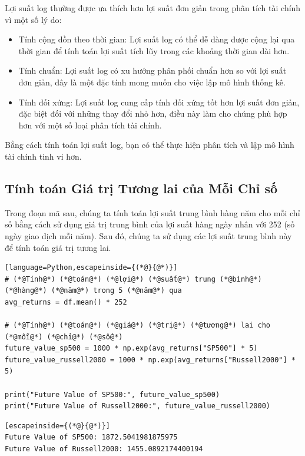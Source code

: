 Lợi suất log thường được ưa thích hơn lợi suất đơn giản trong phân tích tài chính vì một số lý do:

\begin{itemize}
  \item Tính cộng dồn theo thời gian: Lợi suất log có thể dễ dàng được cộng lại qua thời gian để tính toán lợi suất tích lũy trong các khoảng thời gian dài hơn.
  \item Tính chuẩn: Lợi suất log có xu hướng phân phối chuẩn hơn so với lợi suất đơn giản, đây là một đặc tính mong muốn cho việc lập mô hình thống kê.
  \item Tính đối xứng: Lợi suất log cung cấp tính đối xứng tốt hơn lợi suất đơn giản, đặc biệt đối với những thay đổi nhỏ hơn, điều này làm cho chúng phù hợp hơn với một số loại phân tích tài chính.
\end{itemize}
Bằng cách tính toán lợi suất log, bạn có thể thực hiện phân tích và lập mô hình tài chính tinh vi hơn.

\subsection{Tính toán Giá trị Tương lai của Mỗi Chỉ số}

Trong đoạn mã sau, chúng ta tính toán lợi suất trung bình hàng năm cho mỗi chỉ số bằng cách sử dụng giá trị trung bình của lợi suất hàng ngày nhân với 252 (số ngày giao dịch mỗi năm). Sau đó, chúng ta sử dụng các lợi suất trung bình này để tính toán giá trị tương lai.

\begin{lstlisting}[language=Python,escapeinside={(*@}{@*)}]
# (*@Tính@*) (*@toán@*) (*@lợi@*) (*@suất@*) trung (*@bình@*) (*@hàng@*) (*@năm@*) trong 5 (*@năm@*) qua
avg_returns = df.mean() * 252

# (*@Tính@*) (*@toán@*) (*@giá@*) (*@trị@*) (*@tương@*) lai cho (*@mỗi@*) (*@chỉ@*) (*@số@*)
future_value_sp500 = 1000 * np.exp(avg_returns["SP500"] * 5)
future_value_russell2000 = 1000 * np.exp(avg_returns["Russell2000"] * 5)

print("Future Value of SP500:", future_value_sp500)
print("Future Value of Russell2000:", future_value_russell2000)
\end{lstlisting}

\begin{lstlisting}[escapeinside={(*@}{@*)}]
Future Value of SP500: 1872.5041981875975
Future Value of Russell2000: 1455.0892174400194
\end{lstlisting}

